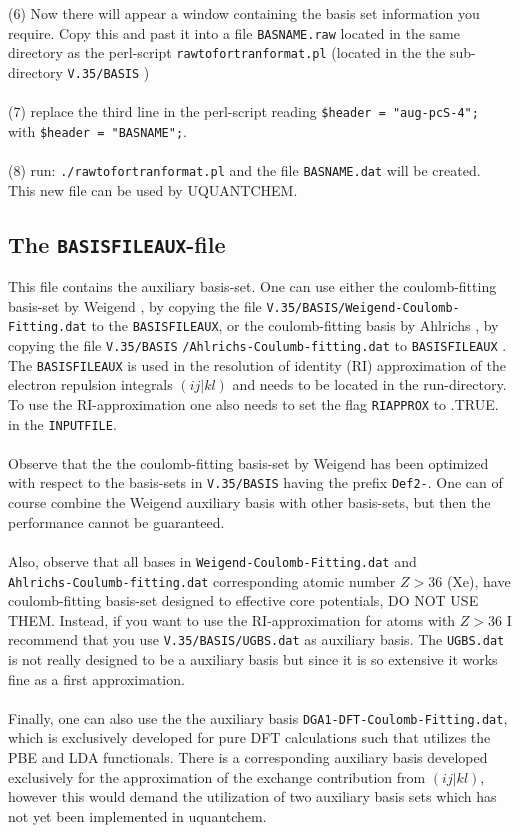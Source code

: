\documentclass[a4paper,twoside,openany]{book}
\begin{document}
(6) Now there will appear a window containing the basis set information you require. Copy this and past it into a file \texttt{BASNAME.raw} located 
in the same directory as the perl-script \texttt{rawtofortranformat.pl} (located in the the sub-directory \texttt{V.35/BASIS}  ) \\ \\
(7) replace the third line in the perl-script reading \texttt{\$header = "aug-pcS-4";} \\ with  \texttt{\$header = "BASNAME";}. \\ \\
(8) run:  \texttt{./rawtofortranformat.pl} and the file \texttt{BASNAME.dat} will be created. This new file 
can be used by UQUANTCHEM.
\newpage
\subsection{The \texttt{BASISFILEAUX}-file}
This file contains the auxiliary basis-set. One can use either the coulomb-fitting basis-set by Weigend \cite{Weigend}, by copying the file 
\texttt{V.35/BASIS/Weigend-Coulomb-Fitting.dat} to the \texttt{BASISFILEAUX}, or the coulomb-fitting basis by Ahlrichs \cite{Ahlrichs1,Ahlrichs2}, by copying the file \texttt{V.35/BASIS} \texttt{/Ahlrichs-Coulumb-fitting.dat}  to \texttt{BASISFILEAUX} . The \texttt{BASISFILEAUX}  is used in the resolution of identity (RI) approximation of the electron repulsion integrals $(ij|kl)$ and needs to be located in the run-directory. To use the RI-approximation one also needs to set the flag \texttt{RIAPPROX} to .TRUE. in the \texttt{INPUTFILE}. \\ \\
Observe that the the coulomb-fitting basis-set by Weigend \cite{Weigend} has been optimized with respect to the basis-sets in \texttt{V.35/BASIS}
having the prefix \texttt{Def2-}. One can of course combine the Weigend auxiliary basis with other basis-sets, but then the performance cannot be 
guaranteed. \\  \\
Also, observe that all bases in \texttt{Weigend-Coulomb-Fitting.dat} and \\ \texttt{Ahlrichs-Coulumb-fitting.dat} corresponding  atomic number $Z>36$ (Xe), have coulomb-fitting basis-set designed to effective core potentials, DO NOT USE THEM. Instead, if you want to use the RI-approximation for atoms
with $Z>36$ I recommend that you use \texttt{V.35/BASIS/UGBS.dat} as auxiliary basis. The \texttt{UGBS.dat} is not really designed to be a auxiliary basis but since it is so extensive it works fine as a first approximation. \\ \\
Finally, one can also use the the auxiliary basis \texttt{DGA1-DFT-Coulomb-Fitting.dat}, which is exclusively developed for pure DFT calculations such that utilizes the PBE and LDA functionals. There is a corresponding auxiliary basis developed exclusively for the approximation of the exchange contribution from $(ij|kl)$, however this would demand the utilization of two auxiliary basis sets which has not yet been implemented in uquantchem.
\end{document}
